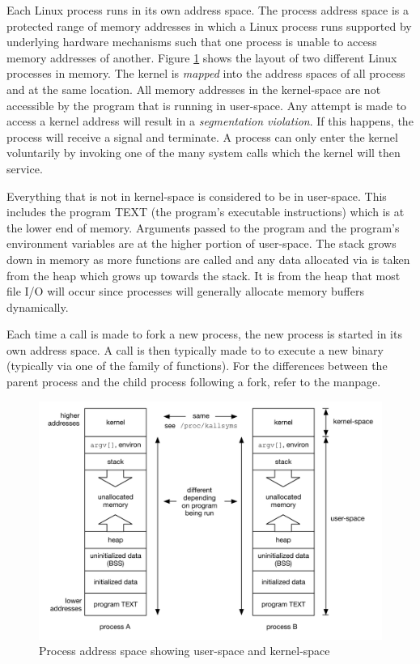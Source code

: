 Each Linux process runs in its own address space. The process address space is a protected range of memory addresses in which a Linux process runs supported by underlying hardware mechanisms such that one process is unable to access memory addresses of another. Figure \ref{fig:process-address-space} shows the layout of two different Linux processes in memory. The kernel is \textit{mapped} into the address spaces of all process and at the same location. All memory addresses in the kernel-space are not accessible by the program that is running in user-space. Any attempt is made to access a kernel address will result in a \textit{segmentation violation}. If this happens, the process will receive a  signal and terminate. A process can only enter the kernel voluntarily by invoking one of the many system calls which the kernel will then service. 

Everything that is not in kernel-space is considered to be in user-space. This includes the program TEXT (the program's executable instructions) which is at the lower end of memory. Arguments passed to the program and the program's environment variables are at the higher portion of user-space. The stack grows down in memory as more functions are called and any data allocated via  is taken from the heap which grows up towards the stack. It is from the heap that most file I/O will occur since processes will generally allocate memory buffers dynamically.

Each time a call is made to fork a new process, the new process is started in its own address space. A call is then typically made to  to execute a new binary (typically via one of the  family of functions). For the differences between the parent process and the child process following a fork, refer to the  manpage.

\begin{figure}[h]
	\includegraphics[scale=0.6]{figures/process-address-space.pdf}
	\centering
	\caption{Process address space showing user-space and kernel-space}
	\label{fig:process-address-space}
\end{figure}
 
